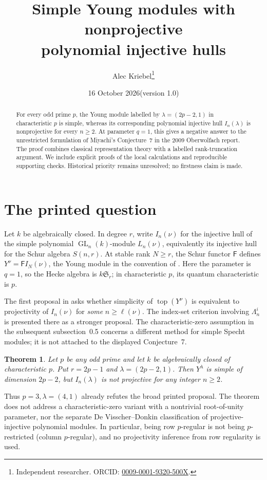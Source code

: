 \documentclass[11pt]{article}
\title{Simple Young modules with nonprojective\\ polynomial injective hulls}
\author{Alec Kriebel\thanks{Independent researcher. ORCID:
\href{https://orcid.org/0009-0001-9320-500X}{0009-0001-9320-500X}.}}
\date{16 October 2026\quad (version 1.0)}
\newtheorem{theorem}{Theorem}
\newcommand{\GL}{\operatorname{GL}}
\newcommand{\topmod}{\operatorname{top}}
\begin{document}
\maketitle
\begin{abstract}
For every odd prime \(p\), the Young module labelled by
\(\lambda=(2p-2,1)\) in characteristic \(p\) is simple, whereas its corresponding
polynomial injective hull \(I_n(\lambda)\) is nonprojective for every \(n\ge2\).
At parameter \(q=1\), this gives a negative answer to the unrestricted
formulation of Miyachi's Conjecture~7 in the 2009 Oberwolfach report.
The proof combines classical representation theory with a labelled
rank-truncation argument. We include explicit proofs of the local calculations
and reproducible supporting checks. Historical priority remains unresolved;
no firstness claim is made.
\end{abstract}

\section{The printed question}
Let \(k\) be algebraically closed. In degree \(r\), write \(I_n(\nu)\) for the
injective hull of the simple polynomial \(\GL_n(k)\)-module \(L_n(\nu)\),
equivalently its injective hull for the Schur algebra \(S(n,r)\).
At stable rank \(N\ge r\), the Schur functor \(\mathsf F\) defines
\(Y^\nu=\mathsf F I_N(\nu)\), the Young module in the convention of
\cite[pp.~945--946]{M}. Here the parameter is \(q=1\), so the Hecke algebra is
\(k\mathfrak S_r\); in characteristic \(p\), its quantum characteristic is \(p\).

The first proposal in \cite[Conjecture~7, p.~946]{M} asks whether simplicity of
\(\topmod(Y^\nu)\) is equivalent to projectivity of \(I_n(\nu)\) for
\emph{some} \(n\ge\ell(\nu)\). The index-set criterion involving
\(\Lambda_n^i\) is presented there as a stronger proposal.
The characteristic-zero assumption in the subsequent subsection~0.5 concerns
a different method for simple Specht modules; it is not attached to the
displayed Conjecture~7.

\begin{theorem}\label{main}
Let \(p\) be any odd prime and let \(k\) be algebraically closed of
characteristic \(p\). Put \(r=2p-1\) and \(\lambda=(2p-2,1)\).
Then \(Y^\lambda\) is simple of dimension \(2p-2\), but \(I_n(\lambda)\)
is not projective for any integer \(n\ge2\).
\end{theorem}

Thus \(p=3,\lambda=(4,1)\) already refutes the broad printed proposal.
The theorem does not address a characteristic-zero variant with a nontrivial
root-of-unity parameter, nor the separate De Visscher--Donkin classification
of projective-injective polynomial modules. In particular, being row
\(p\)-regular is not being \(p\)-restricted (column \(p\)-regular), and no
projectivity inference from row regularity is used.
\end{document}
